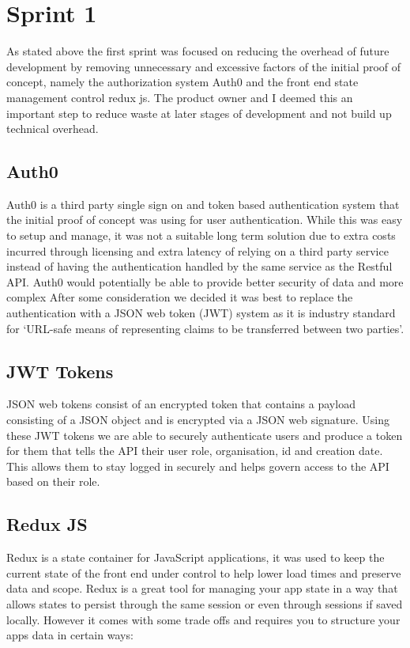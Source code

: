 \section{Sprint 1}
As stated above the first sprint was focused on reducing the overhead of future development by removing unnecessary and excessive factors of the  initial proof of concept, namely the authorization system Auth0 and the front end state management control redux js. The product owner and I deemed this an important step to reduce waste at later stages of development and not build up technical overhead.

\subsection{Auth0}
Auth0 is a third party single sign on and token based authentication system that the initial proof of concept was using for user authentication. While this was easy to setup and manage, it was not a suitable long term solution due to extra costs incurred through licensing and extra latency of  relying on a third party service instead of having the authentication handled by the same service as the Restful API. Auth0 would potentially be able to provide better security of data and more complex 
After some consideration we decided it was best to replace the authentication with a JSON web token (JWT) system as it is industry standard for `URL-safe means of representing claims to be transferred between two parties'\cite{jones2015rfc}.

\subsection{JWT Tokens}
JSON web tokens consist of an encrypted token that contains a payload consisting of a JSON object and is encrypted via a JSON web signature. Using these JWT tokens we are able to securely authenticate users and produce a token for them that tells the API their user role, organisation, id and creation date. This allows them to stay logged in securely and helps govern access to the API based on their role.

\subsection{Redux JS}
Redux is a state container for JavaScript applications, it was used to keep the current state of the front end under control to help lower load times and preserve data and scope. Redux is a great tool for managing your app state in a way that allows states to persist through the same session or even through sessions if saved locally. However it comes with some trade offs and requires you to structure your apps data in certain ways:

